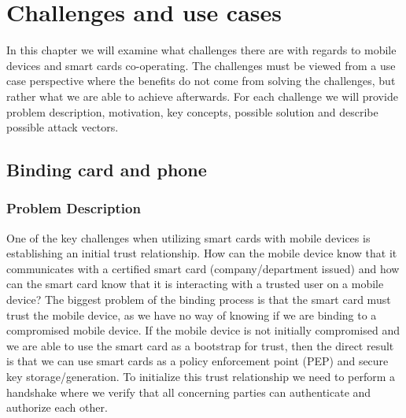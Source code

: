 \chapter{Challenges and use cases}
In this chapter we will examine what challenges there are with regards to mobile devices and smart cards co-operating. The challenges must be viewed from a use case perspective where the benefits do not come from solving the challenges, but rather what we are able to achieve afterwards. For each challenge we will provide problem description, motivation, key concepts, possible solution and describe possible attack vectors.
\section{Binding card and phone}
\label{sec:bindingcardandphone}
\subsection{Problem Description}
One of the key challenges when utilizing smart cards with mobile devices is establishing an initial trust relationship. How can the mobile device know that it communicates with a certified smart card (company/department issued) and how can the smart card know that it is interacting with a trusted user on a mobile device? The biggest problem of the binding process is that the smart card must trust the mobile device, as we have no way of knowing if we are binding to a compromised mobile device.  If the mobile device is not initially compromised and we are able to use the smart card as a bootstrap for trust, then the direct result is that we can use smart cards as a policy enforcement point (PEP) and secure key storage/generation. To initialize this trust relationship we need to perform a handshake where we verify that all concerning parties can authenticate and authorize each other.

